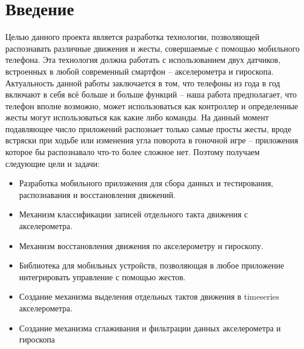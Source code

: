 \section{Введение}

Целью данного проекта является разработка технологии, позволяющей распознавать различные движения и жесты, совершаемые с помощью мобильного телефона. Эта технология должна работать с использованием двух датчиков, встроенных в любой современный смартфон – акселерометра и гироскопа.
Актуальность данной работы заключается в том, что телефоны из года в год включают в себя всё больше и больше функций – наша работа предполагает, что телефон вполне возможно, может использоваться как контроллер и определенные жесты могут использоваться как какие либо команды.
На данный момент подавляющее число приложений распознает только самые просты жесты, вроде встряски при ходьбе или изменения угла поворота в гоночной игре – приложения которое бы распознавало что-то более сложное нет.
Поэтому получаем следующие цели и задачи:

\begin{itemize}
    \item Разработка мобильного приложения для сбора данных и тестирования, распознавания и восстановления движений.
    \item Механизм классификации записей отдельного такта движения с акселерометра.
    \item Механизм восстановления движения по акселерометру и гироскопу.
    \item Библиотека для мобильных устройств, позволяющая в любое приложение интегрировать управление с помощью жестов. 
    \item Создание механизма выделения отдельных тактов движения в timeseries акселерометра.
    \item Создание механизма сглаживания и фильтрации данных акселерометра и гироскопа
\end{itemize}